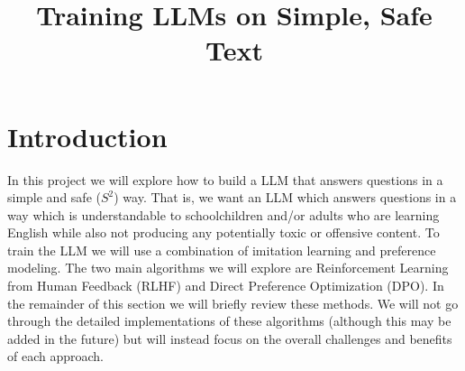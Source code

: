 \documentclass[11pt, oneside]{article}   	%
\title{Training LLMs on Simple, Safe Text}
\begin{document}
\maketitle
\section{Introduction}

In this project we will explore how to build a LLM that answers questions in a simple and safe ($S^{2}$) way.
That is, we want an LLM which answers questions in a way which is understandable to schoolchildren and/or adults who are learning English while also not producing any potentially toxic or offensive content.
To train the LLM we will use a combination of imitation learning and preference modeling.
The two main algorithms we will explore are Reinforcement Learning from Human Feedback (RLHF) and Direct Preference Optimization (DPO). 
In the remainder of this section we will briefly review these methods.
We will not go through the detailed implementations of these algorithms (although this may be added in the future) but will instead focus on the overall challenges and benefits of each approach.

 
\end{document}
